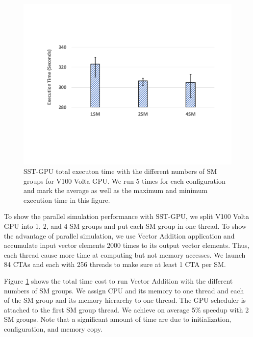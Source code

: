    \begin{figure}[!htb]
      \centering
      \setlength{\abovecaptionskip}{6pt plus 1pt minus 1pt}
      \includegraphics[width=.90\textwidth,keepaspectratio]{figures/par-perf.pdf}
      \captionsetup{width=.90\textwidth}
      \caption{SST-GPU total executon time with the different numbers of SM groups for V100 Volta GPU.
       We run 5 times for each configuration and mark the average as well as the maximum and minimum
       execution time in this figure.}
      \label{fig:par-perf}
   \end{figure}

To show the parallel simulation performance with SST-GPU, we split V100 Volta GPU
into 1, 2, and 4 SM groups and put each SM group in one thread. To show the advantage
of parallel simulation, we use Vector Addition application and accumulate input vector elements
2000 times to its output vector elements. Thus, each thread cause more time at computing
but not memory accesses. We launch 84 CTAs and each with 256 threads to make sure at least
1 CTA per SM.

Figure \ref{fig:par-perf} shows the total time cost to run Vector Addition
with the different numbers of SM groups. We assign CPU and its memory to one thread and
each of the SM group and its memory hierarchy to one thread. The GPU scheduler is attached
to the first SM group thread. We achieve on average 5\% speedup with 2 SM groups. Note that
a significant amount of time are due to initialization, configuration, and memory copy.
